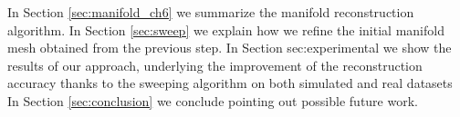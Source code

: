 In Section \ref{sec:manifold_ch6} we summarize the manifold reconstruction algorithm. 
In Section \ref{sec:sweep} we explain how we refine the initial manifold mesh obtained from the previous step. In Section sec:experimental we show the results of our approach, underlying the improvement of the reconstruction accuracy thanks to the sweeping algorithm on both simulated and real datasets In Section \ref{sec:conclusion} we conclude pointing out possible future work.
% 
% 
